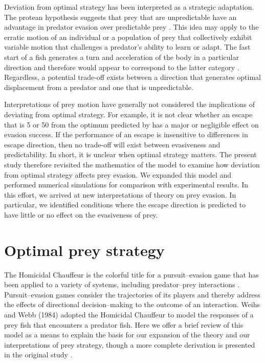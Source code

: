 \documentclass[12pt]{article}
\begin{document}
Deviation from optimal strategy has been interpreted as a strategic adaptation. The protean hypothesis suggests that prey that are unpredictable have an advantage in predator evasion over predictable prey \citep{Humphries:1970hy}. 
This idea may apply to the erratic motion of an individual or a population of prey that collectively exhibit variable motion that challenges a predator's ability to learn or adapt. 
The fast start of a fish generates a turn and acceleration of the body in a particular direction and therefore would appear to correspond to the latter category \citep{D:1973up}. 
Regardless, a potential trade-off exists between a direction that generates optimal displacement from a predator and one that is unpredictable.  

Interpretations of prey motion have generally not considered the implications of deviating from optimal strategy. For example, it is not clear whether an escape that is 5\textdegree\hspace{0.5pt} or 50\textdegree\hspace{0.5pt} from the optimum predicted by \cite{Weihs:1984tb} has a major or negligible effect on evasion success. 
If the performance of an escape is insensitive to differences in escape direction, then no trade-off will exist between evasiveness and predictability. In short, it is unclear when optimal strategy matters. 
The present study therefore revisited the mathematics of the \cite{Weihs:1984tb} model to examine how deviation from optimal strategy affects prey evasion. We expanded this model and performed numerical simulations for comparison with experimental results. In this effort, we arrived at new interpretations of theory on prey evasion. In particular, we identified conditions where the escape direction is predicted to have little or no effect on the evasiveness of prey.

\section{Optimal prey strategy}
\label{opt_strategy}

The Homicidal Chauffeur is the colorful title for a pursuit--evasion game that has been applied to a variety of systems, including predator--prey interactions \citep{Isaacs:1965va}. Pursuit--evasion games consider the trajectories of its players and thereby address the effects of directional decision--making to the outcome of an interaction. 
Weihs and Webb (1984) adopted the Homicidal Chauffeur to model the responses of a prey fish that encounters a predator fish. Here we offer a brief review of this model as a means to explain the basis for our expansion of the theory and our interpretations of prey strategy, though a more complete derivation is presented in the original study \citep{Weihs:1984tb}.
\end{document}
